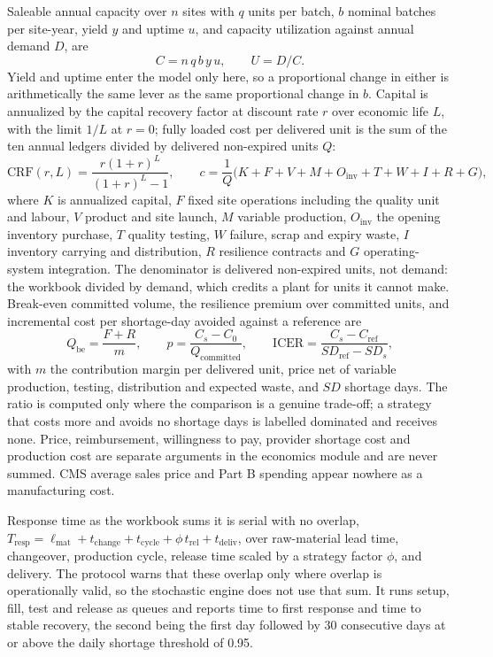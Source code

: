 Saleable annual capacity over $n$ sites with $q$ units per batch, $b$ nominal batches per
site-year, yield $y$ and uptime $u$, and capacity utilization against annual demand $D$, are
\begin{equation}
C = n \, q \, b \, y \, u ,
\qquad
U = D / C .
\label{eq:capacity}
\end{equation}
Yield and uptime enter the model only here, so a proportional change in either is
arithmetically the same lever as the same proportional change in $b$. Capital is annualized by
the capital recovery factor at discount rate $r$ over economic life $L$, with the limit $1/L$ at
$r=0$; fully loaded cost per delivered unit is the sum of the ten annual ledgers divided by
delivered non-expired units $Q$:
\begin{equation}
\mathrm{CRF}(r,L) = \frac{r(1+r)^{L}}{(1+r)^{L}-1} ,
\qquad
c = \frac{1}{Q}\bigl( K + F + V + M + O_{\mathrm{inv}} + T + W + I + R + G \bigr),
\label{eq:unitcost}
\end{equation}
where $K$ is annualized capital, $F$ fixed site operations including the quality unit and
labour, $V$ product and site launch, $M$ variable production, $O_{\mathrm{inv}}$ the opening
inventory purchase, $T$ quality testing, $W$ failure, scrap and expiry waste, $I$ inventory
carrying and distribution, $R$ resilience contracts and $G$ operating-system integration. The
denominator is delivered non-expired units, not demand: the workbook divided by demand, which
credits a plant for units it cannot make. Break-even committed volume, the resilience premium
over committed units, and incremental cost per shortage-day avoided against a reference are
\begin{equation}
Q_{\mathrm{be}} = \frac{F+R}{m} ,
\qquad
p = \frac{C_{s}-C_{0}}{Q_{\mathrm{committed}}} ,
\qquad
\mathrm{ICER} = \frac{C_{s}-C_{\mathrm{ref}}}{SD_{\mathrm{ref}}-SD_{s}} ,
\label{eq:economics}
\end{equation}
with $m$ the contribution margin per delivered unit, price net of variable production, testing,
distribution and expected waste, and $SD$ shortage days. The ratio is computed only where the
comparison is a genuine trade-off; a strategy that costs more and avoids no shortage days is
labelled dominated and receives none. Price, reimbursement, willingness to pay, provider
shortage cost and production cost are separate arguments in the economics module and are never
summed. CMS average sales price and Part B spending appear nowhere as a manufacturing cost.

Response time as the workbook sums it is serial with no overlap,
$T_{\mathrm{resp}} = \ell_{\mathrm{mat}} + t_{\mathrm{change}} + t_{\mathrm{cycle}} +
\phi\, t_{\mathrm{rel}} + t_{\mathrm{deliv}}$, over raw-material lead time, changeover,
production cycle, release time scaled by a strategy factor $\phi$, and delivery. The protocol
warns that these overlap only where overlap is operationally valid, so the stochastic engine
does not use that sum. It runs setup, fill, test and release as queues and reports time to first
response and time to stable recovery, the second being the first day followed by 30 consecutive
days at or above the daily shortage threshold of 0.95.

